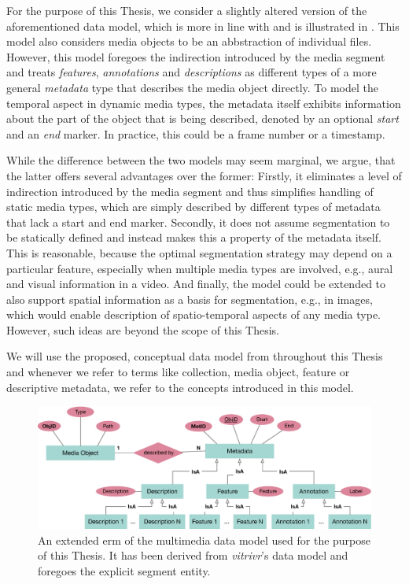 For the purpose of this Thesis, we consider a slightly altered version of the aforementioned data model, which is more in line with \cite{Blanken:2007multimedia} and is illustrated in . This model also considers media objects to be an abbstraction of individual files. However, this model foregoes the indirection introduced by the media segment and treats \emph{features}, \emph{annotations} and \emph{descriptions} as different types of a more general \emph{metadata} type that describes the media object directly. To model the temporal aspect in dynamic media types, the metadata itself exhibits information about the part of the object that is being described, denoted by an optional \emph{start} and an \emph{end} marker. In practice, this could be a frame number or a timestamp.

While the difference between the two models may seem marginal, we argue, that the latter offers several advantages over the former: Firstly, it eliminates a level of indirection introduced by the media segment and thus simplifies handling of static media types, which are simply described by different types of metadata that lack a start and end marker. Secondly, it does not assume segmentation to be statically defined and instead makes this a property of the metadata itself. This is reasonable, because the optimal segmentation strategy may depend on a particular feature, especially when multiple media types are involved, e.g., aural and visual information in a video. And finally, the model could be extended to also support spatial information as a basis for segmentation, e.g., in images, which would enable description of spatio-temporal aspects of any media type. However, such ideas are beyond the scope of this Thesis. 

We will use the proposed, conceptual data model from  throughout this Thesis and whenever we refer to terms like collection, media object, feature or descriptive metadata, we refer to the concepts introduced in this model.

\begin{figure}[bt]
    \centering
    \includegraphics[width=\textwidth]{figures/erm-media-data}
    \caption{An extended \acrshort{erm} of the multimedia data model used for the purpose of this Thesis. It has been derived from \emph{vitrivr}'s data model and foregoes the explicit segment entity.}
    \label{figure:erm_mediadata}
\end{figure}

